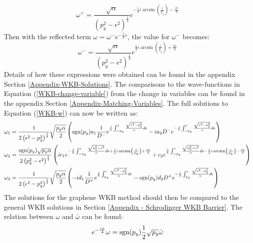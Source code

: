 		\begin{equation}
			\omega^{+}=\frac{\sqrt{\alpha}}{\left(p_{y}^{2}-\epsilon^{2}\right)^{\frac{1}{4}}}e^{-\frac{1}{2}i\arcsin\left(\frac{\epsilon}{p_{y}}\right)-\frac{i\pi}{4}}
		\end{equation}
		Then with the reflected term $\omega=\omega^{-}e^{-\frac{1}{h}s}$, the value for $\omega^{-}$ becomes:
		\begin{equation}
			\omega^{-}=\frac{\sqrt{\alpha}}{\left(p_{y}^{2}-\epsilon^{2}\right)^{\frac{1}{4}}}e^{\frac{1}{2}i\arcsin\left(\frac{\epsilon}{p_{y}}\right)+\frac{i\pi}{4}}
		\end{equation}
		Details of how these expressions were obtained can be found in the appendix Section \ref{Appendix-WKB-Solutions}. The comparisons to the wave-functions in Equation (\ref{WKB-change-variable}) from the change in variables can be found in the appendix Section \ref{Appendix-Matching-Variables}. The full solutions to Equation (\ref{WKB-w}) can now be written as:
		\begin{align}
			\omega_{1}&=\frac{1}{2\left(\epsilon^{2}-p_{y}^{2}\right)^{\frac{1}{4}}}\sqrt{\frac{p_{y}\alpha}{2}}\left(\operatorname{sgn}(p_{y})a_{1}\frac{1}{D^{-}}e^{\frac{i}{h}\int^{\epsilon}_{-p_{y}}\frac{\sqrt{\epsilon^{2}-p_{y}^{2}}}{\alpha}d\epsilon}-ia_{2}D^{-}e^{-\frac{i}{h}\int^{\epsilon}_{-p_{y}}\frac{\sqrt{\epsilon^{2}-p_{y}^{2}}}{\alpha}d\epsilon}\right)\\
			\omega_{2}&=\frac{\operatorname{sgn}(p_{y})\sqrt{p_{y}\alpha}}{2\left(p_{y}^{2}-\epsilon^{2}\right)^{\frac{1}{4}}}\left(ic_{1}e^{-\frac{1}{h}\int^{\epsilon}_{-p_{y}}\frac{\sqrt{p_{y}^{2}-\epsilon^{2}}}{\alpha}d\epsilon+\frac{1}{2}i\arcsin\left(\frac{\epsilon}{p_{y}}\right)+\frac{i\pi}{4}}+c_{2}e^{\frac{1}{h}\int^{\epsilon}_{-p_{y}}\frac{\sqrt{p_{y}^{2}-\epsilon^{2}}}{\alpha}d\epsilon-\frac{1}{2}i\arcsin\left(\frac{\epsilon}{p_{y}}\right)-\frac{i\pi}{4}}\right)\\
			\omega_{3}&=\frac{1}{2\left(\epsilon^{2}-p_{y}^{2}\right)^{\frac{1}{4}}}\sqrt{\frac{p_{y}\alpha}{2}}\left(-id_{1}\frac{1}{D^{+}}e^{\frac{i}{h}\int^{\epsilon}_{p_{y}}\frac{\sqrt{\epsilon^{2}-p_{y}^{2}}}{\alpha}d\epsilon}-\operatorname{sgn}(p_{y})d_{2}D^{+}e^{-\frac{i}{h}\int^{\epsilon}_{p_{y}}\frac{\sqrt{\epsilon^{2}-p_{y}^{2}}}{\alpha}d\epsilon}\right)
			\label{omega-final}
		\end{align}
		The solutions for the graphene WKB method should then be compared to the general WKB solutions in Section \ref{Appendix - Schrodinger WKB Barrier}. The relation between $\omega$ and $\bar{\omega}$ can be found:
		\begin{gather}
			e^{-\frac{i\pi}{4}}\omega=\operatorname{sgn}(p_{y})\frac{1}{2}\sqrt{p_{y}}\bar{\omega}
		\end{gather}
